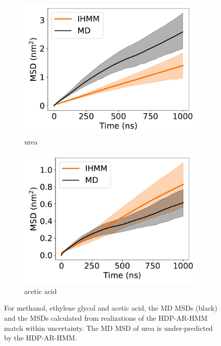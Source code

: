 \documentclass[journal=jpcbfk,manuscript=article]{achemso}
\begin{document}
\begin{figure}
\begin{subfigure}{0.24\textwidth}
  \includegraphics[width=\textwidth]{unclustered_msd_URE.pdf}
  \caption{urea}\label{fig:unclustered_msd_URE}
  \end{subfigure}
  \begin{subfigure}{0.24\textwidth}
  \includegraphics[width=\textwidth]{unclustered_msd_ACH.pdf}
  \caption{acetic acid}\label{fig:unclustered_msd_ACH}
  \end{subfigure}
  \caption{For methanol, ethylene glycol and acetic acid, the MD MSDs (black) and the MSDs
  calculated from realizations of the HDP-AR-HMM match within uncertainty. The MD MSD of
  urea is under-predicted by the HDP-AR-HMM.}\label{fig:unclustered_msds}
  \end{figure}
  
\end{document}
